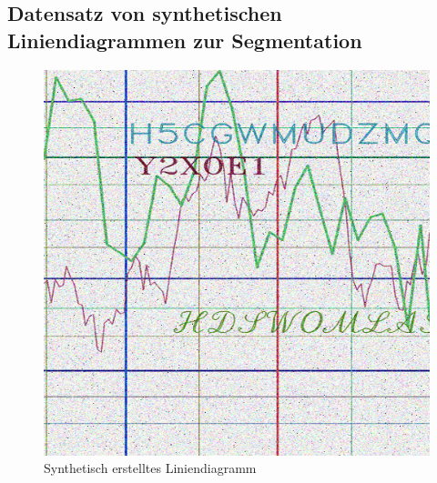 \clearpage

\subsection{Datensatz von synthetischen Liniendiagrammen zur Segmentation}
\label{ch:genlines}

\begin{figure}[H] %
    \centering
    \begin{minipage}{0.475\textwidth} %
        \centering
        \includegraphics[width=\linewidth]{Methodik/img/lines_synthetic.png}
        \caption{ Synthetisch erstelltes Liniendiagramm}
        \label{fig:lines_synthetic}
    \end{minipage}\hfill %
    \begin{minipage}{0.475\textwidth} %
        \centering

\end{minipage}
\end{figure}
